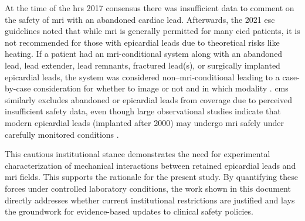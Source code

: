 At the time of the \gls{hrs} 2017 consensus there was insufficient data to comment on the safety of \gls{mri} with an abandoned cardiac lead. Afterwards, the 2021 \gls{esc} guidelines noted that while \gls{mri} is generally permitted for many \gls{cied} patients, it is not recommended for those with epicardial leads due to theoretical risks like heating. If a patient had an \gls{mri}-conditional system along with an abandoned lead, lead extender, lead remnants, fractured lead(s), or surgically implanted epicardial leads, the system was considered non–\gls{mri}-conditional leading to a case-by-case consideration for whether to image or not and in which modality \cite{schaller2021}. \gls{cms} similarly excludes abandoned or epicardial leads from coverage due to perceived insufficient safety data, even though large observational studies indicate that modern epicardial leads (implanted after 2000) may undergo \gls{mri} safely under carefully monitored conditions \cite{vuorinen2021}.

This cautious institutional stance demonstrates the need for experimental characterization of mechanical interactions between retained epicardial leads and \gls{mri} fields. This supports the rationale for the present study. By quantifying these forces under controlled laboratory conditions, the work shown in this document directly addresses whether current institutional restrictions are justified and lays the groundwork for evidence-based updates to clinical safety policies.